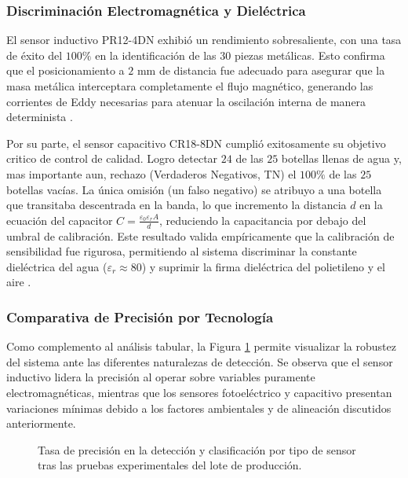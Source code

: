 \documentclass[conference]{IEEEtran}
\begin{document}
\subsubsection{Discriminación Electromagnética y Dieléctrica}
El sensor inductivo PR12-4DN exhibió un rendimiento sobresaliente, con una tasa de éxito del $100\%$ en la identificación de las $30$ piezas metálicas. Esto confirma que el posicionamiento a $2$ mm de distancia fue adecuado para asegurar que la masa metálica interceptara completamente el flujo magnético, generando las corrientes de Eddy necesarias para atenuar la oscilación interna de manera determinista \cite{sensores_5}.

Por su parte, el sensor capacitivo CR18-8DN cumplió exitosamente su objetivo critico de control de calidad. Logro detectar $24$ de las $25$ botellas llenas de agua y, mas importante aun, rechazo (Verdaderos Negativos, TN) el $100\%$ de las $25$ botellas vacías. La única omisión (un falso negativo) se atribuyo a una botella que transitaba descentrada en la banda, lo que incremento la distancia $d$ en la ecuación del capacitor $C = \frac{\varepsilon_0 \varepsilon_r A}{d}$, reduciendo la capacitancia por debajo del umbral de calibración. Este resultado valida empíricamente que la calibración de sensibilidad fue rigurosa, permitiendo al sistema discriminar la constante dieléctrica del agua ($\varepsilon_r \approx 80$) y suprimir la firma dieléctrica del polietileno y el aire \cite{sensores_16}.

\subsubsection{Comparativa de Precisión por Tecnología}

Como complemento al análisis tabular, la Figura \ref{fig:precision_sensores} permite visualizar la robustez del sistema ante las diferentes naturalezas de detección. Se observa que el sensor inductivo lidera la precisión al operar sobre variables puramente electromagnéticas, mientras que los sensores fotoeléctrico y capacitivo presentan variaciones mínimas debido a los factores ambientales y de alineación discutidos anteriormente.

\begin{figure}[H]
\centering
{}
\caption{Tasa de precisión en la detección y clasificación por tipo de sensor tras las pruebas experimentales del lote de producción.}
\label{fig:precision_sensores}
\end{figure}
\end{document}
